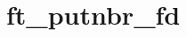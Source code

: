 \chapter{ft\+\_\+putnbr\+\_\+fd}
\hypertarget{md_Documentation_2ft__putnbr__fd}{}\label{md_Documentation_2ft__putnbr__fd}
